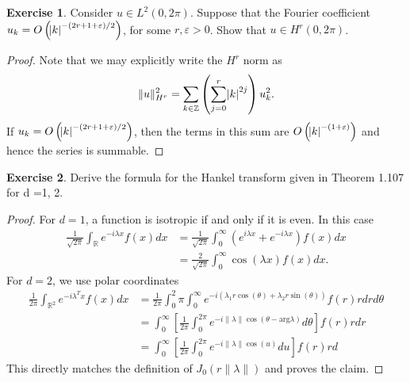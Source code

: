 \documentclass{amsart}
\theoremstyle{plain}
\theoremstyle{definition}
\newtheorem{exer}{Exercise}[section]
\newcommand{\R}{\mathbb{R}}
\newcommand{\Z}{\mathbb{Z}}
\begin{document}
\begin{exer}
    Consider $u \in L^2(0,2\pi)$. Suppose that the Fourier coefficient $u_k = O\left(\abs{k}^{-(2r+1+\varepsilon)/2}\right) $, for some $r,\varepsilon >0$. Show that $u \in H^r (0,2\pi)$.
\end{exer}
\begin{proof}
Note that we may explicitly write the $H^r$ norm as 
$$\|u\|_{H^r}^2 = \sum_{k\in \Z}\left(\sum_{j=0}^r \abs{k}^{2j}\right)u_k^2.$$
If $u_k = O\left(\abs{k}^{-(2r+1+\varepsilon)/2}\right)$, then the terms in this sum are $O\left(\abs{k}^{-(1+\varepsilon)}\right)$ and hence the series is summable. 
\end{proof}

\begin{exer}
    Derive the formula for the Hankel transform given in Theorem 1.107 for d =1, 2.
\end{exer}
\begin{proof}
For $d=1$, a function is isotropic if and only if it is even. In this case
\begin{align*}
    \frac{1}{\sqrt{2\pi}}\int_{\R}e^{-i\lambda x}f(x) dx & = \frac{1}{\sqrt{2\pi}} \int_{0}^{\infty}\left(e^{i\lambda x}+e^{-i\lambda x}\right) f(x) dx \\
    & = \frac{2}{\sqrt{2\pi}} \int_0^\infty \cos(\lambda x) f(x)dx.
\end{align*}
For $d=2$, we use polar coordinates
\begin{align*}
    \frac{1}{2\pi}\int_{\R^2}e^{-i\lambda^T x}f(x) dx &=\frac{1}{2\pi}\int_{0}^2\pi \int_0^\infty e^{-i\left(\lambda_1 r\cos(\theta) + \lambda_2 r\sin(\theta) \right)}f(r)r dr d\theta \\
    & = \int_0^\infty \left[\frac{1}{2\pi} \int_0^{2\pi} e^{-i \|\lambda\| \cos\left(\theta-\text{arg}\lambda\right)} d\theta \right] f(r)r dr\\
    &=  \int_0^\infty \left[\frac{1}{2\pi} \int_0^{2\pi} e^{-i \|\lambda\| \cos\left(u\right)} du\right] f(r)r d
\end{align*}
This directly matches the definition of $J_0\left(r\|\lambda\|\right)$ and proves the claim.
\end{proof}
\end{document}

